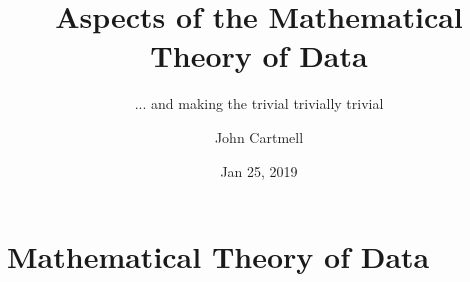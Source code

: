 

\usepackage{mathptmx}
\usepackage{amsfonts}
\usepackage{wasysym}
\usepackage{url}
\usepackage{hyperref}


\newcommand{\sharedmacros}{../../SharedMacros}










\renewcommand{\erpictureFolder}[0]{../../SharedPictures}
\setcounter{equation}{0}


\title[John Cartmell]{Aspects of the Mathematical Theory of Data}
\subtitle{... and making the trivial trivially trivial}
\author{John Cartmell}
\date{Jan 25, 2019}

\usepackage{framed}
\usepackage{bibentry}
\usepackage{colortbl}
\usepackage{ulem}   %
\usepackage{listings}
\usepackage{arydshln} %

\nobibliography*



\begin{frame}
\titlepage
\end{frame}

\iffalse
\begin{frame}{Test}
\begin{description}	[longest label] 
\item<1->[short] Some text. 
\item<2->[longest label] Some text. 
\item<3->[long label] Some text. 
\end{description}
\end{frame}
\fi

\section{Mathematical Theory of Data}

